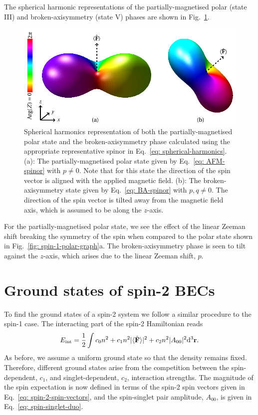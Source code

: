 The spherical harmonic representations of the partially-magnetised polar
(state III) and broken-axisymmetry (state V) phases are shown in
Fig.~\ref{fig: spin-1-magnetised-graph}.
\begin{figure}
    \includegraphics[height=0.4\textwidth, width=\textwidth]
    {gfx/ch-groundStateSymmetries/spin-1-magnetised.pdf}
    \caption[Spherical harmonic representation of the partially-magnetised polar
    and broken-axisymmetry phases in a spin-1 system]
    {\label{fig: spin-1-magnetised-graph}
    Spherical harmonics representation of both the partially-magnetised polar
    state and the broken-axisymmetry phase calculated using the appropriate
    representative spinor in Eq.~\eqref{eq: spherical-harmonics}.
    (a): The partially-magnetised polar state given by
    Eq.~\eqref{eq: AFM-spinor} with \(p \neq 0\).
    Note that for this state the direction of the spin vector is aligned with
    the applied magnetic field.
    (b): The broken-axisymmetry state given by Eq.~\eqref{eq: BA-spinor} with
    \(p, q \neq 0\).
    The direction of the spin vector is tilted away from the magnetic field
    axis, which is assumed to be along the \(z\)-axis.}
\end{figure}
For the partially-magnetised polar state, we see the effect of the linear
Zeeman shift breaking the symmetry of the spin when compared to the polar state
shown in Fig.~\ref{fig: spin-1-polar-graph}a.
The broken-axisymmetry phase is seen to tilt against the \(z\)-axis, which
arises due to the linear Zeeman shift, \(p\).

\section{Ground states of spin-2 BECs}\label{sec: ground-states-spin-2}
To find the ground states of a spin-2 system we follow a similar procedure to
the spin-1 case.
The interacting part of the spin-2 Hamiltonian reads
\begin{align}
    E_\mathrm{int} = \frac{1}{2}\int c_0n^2 + c_1n^2|\langle \hat{\vb{F}} \rangle |^2+c_2n^2|A_{00}|^2
    \dd^3\vb{r}.
\end{align}
As before, we assume a uniform ground state so that the density remains fixed.
Therefore, different ground states arise from the competition between the
spin-dependent, \(c_1\), and singlet-dependent, \(c_2\), interaction strengths.
The magnitude of the spin expectation is now defined in terms of the spin-2
spin vectors given in Eq.~\eqref{eq: spin-2-spin-vectors}, and the spin-singlet
pair amplitude, \(A_{00}\), is given in Eq.~\eqref{eq: spin-singlet-duo}.

